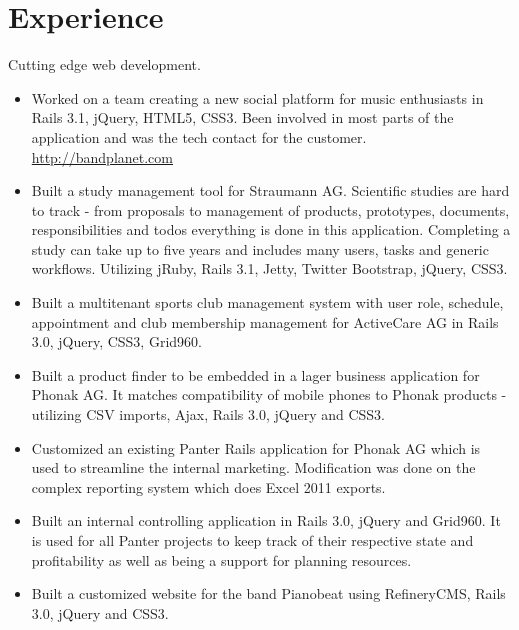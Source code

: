 \documentclass[10pt,a4paper]{moderncv}
\begin{document}
\maketitle

\section{Experience}
{Cutting edge web development.\newline{}%
\begin{itemize}%
  \item Worked on a team creating a new social platform for music enthusiasts
    in Rails 3.1, jQuery, HTML5, CSS3. Been involved in most parts of the application
    and was the tech contact for the customer.\\
        \url{http://bandplanet.com}
  \item Built a study management tool for Straumann AG. Scientific studies are
    hard to track - from proposals to management of
    products, prototypes, documents, responsibilities and todos everything is done
    in this application. Completing a study can take up to five years and
    includes many users, tasks and generic workflows. Utilizing jRuby, Rails
    3.1, Jetty, Twitter Bootstrap, jQuery, CSS3.
  \item Built a multitenant sports club management system with user role,
    schedule, appointment and club membership management for ActiveCare AG in
    Rails 3.0, jQuery, CSS3, Grid960.
  \item Built a product finder to be embedded in a lager business application
    for Phonak AG. It matches compatibility of mobile phones to Phonak
    products - utilizing CSV imports, Ajax, Rails 3.0, jQuery and
    CSS3.
  \item Customized an existing Panter Rails application for Phonak AG which
    is used to streamline the internal marketing. Modification was done on the
    complex reporting system which does Excel 2011 exports.
  \item Built an internal controlling application in Rails 3.0, jQuery and
    Grid960. It is used for all Panter projects to keep track of their
    respective state and profitability as well as being a support for planning
    resources.
  \item Built a customized website for the band Pianobeat using RefineryCMS, Rails 3.0,
    jQuery and CSS3.\\

\end{itemize}}
\end{document}
